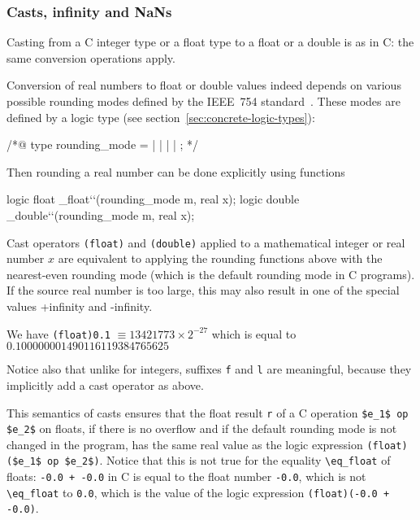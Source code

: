 \subsubsection{Casts, infinity and NaNs}

Casting from a C integer type or a float type to a float
or a double is as in C: the same conversion operations apply.

Conversion of real numbers to float or double values indeed depends on
various possible rounding modes defined by the IEEE~754
standard~\cite{float-std,wikipedia-float}. These modes are defined by
a logic type (see section~\ref{sec:concrete-logic-types}):
\begin{listing-nonumber}
/*@ type rounding_mode = \Up | \Down | \ToZero | \NearestAway | \NearestEven;
*/
\end{listing-nonumber}
Then rounding a real number can be done explicitly using functions
\begin{listing-nonumber}
  logic float \round_float``(rounding_mode m, real x);
  logic double \round_double``(rounding_mode m, real x);
\end{listing-nonumber}
Cast operators \lstinline|(float)| and \lstinline|(double)| applied to a
mathematical integer or real number $x$ are equivalent to applying the
rounding functions above with the nearest-even rounding mode (which is
the default rounding mode in C programs).
If the source real number is too large, this may also result in one
of the special values +infinity and -infinity.
\begin{example}
  We have
  \lstinline|(float)0.1| $\equiv 13421773 \times 2 ^{-27}$ which is equal to
  $0.100000001490116119384765625$
\end{example}
Notice also that unlike for integers, suffixes \lstinline|f| and
\lstinline|l| are
meaningful, because they implicitly add a cast operator as above.

This semantics of casts ensures that the float result \lstinline|r| of
a C operation \lstinline|$e_1$ op $e_2$| on floats, if there is no
overflow and if the default
rounding mode is not changed in the program, has the same real value
as the logic expression \lstinline|(float)($e_1$ op $e_2$)|. Notice
that this is not
true for the equality \lstinline|\eq_float| of floats: \lstinline|-0.0 + -0.0|
in C is equal to the float number \lstinline|-0.0|, which is not
\lstinline|\eq_float| to \lstinline|0.0|, which is the value of the logic
expression \lstinline|(float)(-0.0 + -0.0)|.

